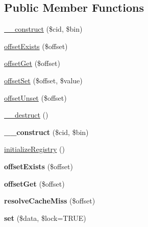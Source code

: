 \subsection*{Public Member Functions}
\begin{DoxyCompactItemize}
\item 
\hyperlink{group__schemaapi_gadbc374d9057276944d38062e769a1a99}{\_\-\_\-construct} (\$cid, \$bin)
\item 
\hyperlink{group__schemaapi_gabec90ca8c02f7c14dfbf66fd9e6bb5dd}{offsetExists} (\$offset)
\item 
\hyperlink{group__schemaapi_ga57be4d1b39bee68ee1c395c1cd9a2de5}{offsetGet} (\$offset)
\item 
\hyperlink{group__schemaapi_ga0d3377e6f4b8c592f006a75f8eadf21a}{offsetSet} (\$offset, \$value)
\item 
\hyperlink{group__schemaapi_ga8bb43551e89c35590c56a49f8fb54e3f}{offsetUnset} (\$offset)
\item 
\hyperlink{group__schemaapi_ga63c3aa47f3a451f0c5182800d29d5d9f}{\_\-\_\-destruct} ()
\item 
\hypertarget{classDrupalCacheArray_adbc374d9057276944d38062e769a1a99}{
{\bfseries \_\-\_\-construct} (\$cid, \$bin)}
\label{classDrupalCacheArray_adbc374d9057276944d38062e769a1a99}

\item 
\hyperlink{classDrupalCacheArray_a0d87b8b0e005c00bbf7fa6ed11cd1e26}{initializeRegistry} ()
\item 
\hypertarget{classDrupalCacheArray_abec90ca8c02f7c14dfbf66fd9e6bb5dd}{
{\bfseries offsetExists} (\$offset)}
\label{classDrupalCacheArray_abec90ca8c02f7c14dfbf66fd9e6bb5dd}

\item 
\hypertarget{classDrupalCacheArray_a57be4d1b39bee68ee1c395c1cd9a2de5}{
{\bfseries offsetGet} (\$offset)}
\label{classDrupalCacheArray_a57be4d1b39bee68ee1c395c1cd9a2de5}

\item 
\hypertarget{classDrupalCacheArray_a33d892a839b353177e2483f6946178e9}{
{\bfseries resolveCacheMiss} (\$offset)}
\label{classDrupalCacheArray_a33d892a839b353177e2483f6946178e9}

\item 
\hypertarget{classDrupalCacheArray_a9d99af903ba2660c09ca835e63c79118}{
{\bfseries set} (\$data, \$lock=TRUE)}
\label{classDrupalCacheArray_a9d99af903ba2660c09ca835e63c79118}

\end{DoxyCompactItemize}
